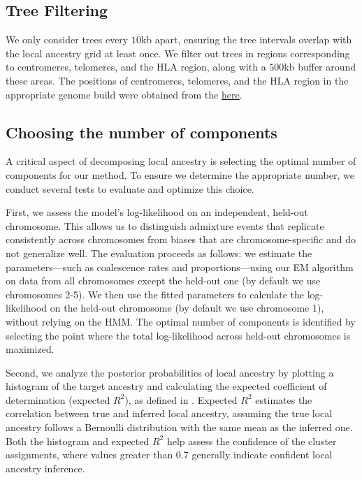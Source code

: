 \subsection{Tree Filtering}

We only consider trees every $10$kb apart, ensuring the tree intervals overlap with the local ancestry grid at least once.
%
%
We filter out trees in regions corresponding to centromeres, telomeres, and the HLA region, along with a $500$kb buffer around these areas. The positions of centromeres, telomeres, and the HLA region in the appropriate genome build were obtained from the \href{https://genome.ucsc.edu/goldenPath/help/ftp.html}{here}.
%

\subsection{Choosing the number of components}
\label{sec:ch2-gb-selecting-clusters}

A critical aspect of decomposing local ancestry is selecting the optimal number of components for our method. To ensure we determine the appropriate number, we conduct several tests to evaluate and optimize this choice.

First, we assess the model’s log-likelihood on an independent, held-out chromosome. This allows us to distinguish admixture events that replicate consistently across chromosomes from biases that are chromosome-specific and do not generalize well. The evaluation proceeds as follows: we estimate the parameters—such as coalescence rates and proportions—using our EM algorithm on data from all chromosomes except the held-out one (by default we use chromosomes 2-5). We then use the fitted parameters to calculate the log-likelihood on the held-out chromosome (by default we use chromosome 1), without relying on the HMM. The optimal number of components is identified by selecting the point where the total log-likelihood across held-out chromosomes is maximized.

Second, we analyze the posterior probabilities of local ancestry by plotting a histogram of the target ancestry and calculating the expected coefficient of determination (expected $R^2$), as defined in \cite{price2009sensitive,salter2019fine}. Expected $R^2$ estimates the correlation between true and inferred local ancestry, assuming the true local ancestry follows a Bernoulli distribution with the same mean as the inferred one. Both the histogram and expected $R^2$ help assess the confidence of the cluster assignments, where values greater than 0.7 generally indicate confident local ancestry inference. 

